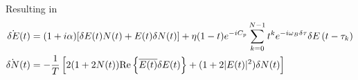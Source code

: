 %
Resulting in
%
\begin{align}
    \dot{\delta E}(t) &= (1+i \alpha)[\delta E(t) N(t)+E(t) \delta N(t)]+\eta(1-t) e^{-i C_p} \sum_{k=0}^{N-1} t^{k} e^{-i \omega_B \delta \tau} \delta E\left(t-\tau_{k}\right)
    \\
    \dot{\delta N}(t) &=-\frac{1}{T}\left[2(1+2 N(t)) \text{Re}\left\{\overline{E(t)} \delta E(t)\right\} + (1+2|E(t)|^{2} ) \delta N(t) \right]
\end{align}